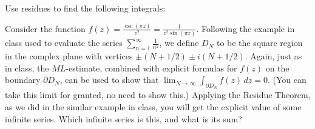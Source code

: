 \documentclass[11pt]{exam}
\newcommand{\ds}{\displaystyle}
\DeclareMathOperator*{\Res}{Res}
\begin{document}
\begin{questions}
\begin{multicols}{2}
  \end{multicols}
  
  \question Use residues to find the following integrals:
  \begin{multicols}{2}
  \end{multicols}

  \question Consider the function $\ds f(z) = \frac{\csc (\pi z)}{z^2}
  = \frac{1}{z^2 \sin (\pi z)}$. Following the example in class used
  to evaluate the series $\ds \sum_{n=1}^\infty \frac{1}{n^2}$, we
  define $D_N$ to be the square region in the complex plane with
  vertices $\pm (N+1/2) \pm i (N+1/2)$. Again, just as in class, the
  $ML$-estimate, combined with explicit formulas for $f(z)$ on the
  boundary $\partial D_N$, can be used to show that $\ds
  \lim_{N\to\infty} \int_{\partial D_N} f(z) \, dz = 0$. (You can take
  this limit for granted, no need to show this.) Applying the Residue
  Theorem, as we did in the similar example in class, you will get the
  explicit value of some infinite series. Which infinite series is this,
  and what is its sum?
\end{questions}
\end{document}
